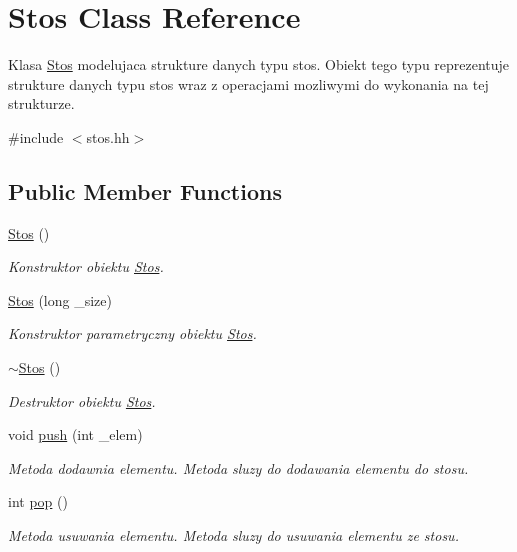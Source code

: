 \hypertarget{class_stos}{\section{Stos Class Reference}
\label{class_stos}
}


Klasa \hyperlink{class_stos}{Stos} modelujaca strukture danych typu stos. Obiekt tego typu reprezentuje strukture danych typu stos wraz z operacjami mozliwymi do wykonania na tej strukturze.  




{\ttfamily \#include $<$stos.\-hh$>$}

\subsection*{Public Member Functions}
\begin{DoxyCompactItemize}
\item 
\hyperlink{class_stos_a1de3b50386d5dfb56ddece17d0ea2389}{Stos} ()
\begin{DoxyCompactList}\small\item\em Konstruktor obiektu \hyperlink{class_stos}{Stos}. \end{DoxyCompactList}\item 
\hyperlink{class_stos_a6606affc11eed2b059b8caf287ffca25}{Stos} (long \-\_\-size)
\begin{DoxyCompactList}\small\item\em Konstruktor parametryczny obiektu \hyperlink{class_stos}{Stos}. \end{DoxyCompactList}\item 
\hyperlink{class_stos_af9a198e2540e18adcc0b5259105fd78e}{$\sim$\-Stos} ()
\begin{DoxyCompactList}\small\item\em Destruktor obiektu \hyperlink{class_stos}{Stos}. \end{DoxyCompactList}\item 
void \hyperlink{class_stos_afd5802e405946328cccca3eed676b493}{push} (int \-\_\-elem)
\begin{DoxyCompactList}\small\item\em Metoda dodawnia elementu. Metoda sluzy do dodawania elementu do stosu. \end{DoxyCompactList}\item 
int \hyperlink{class_stos_aabb14b8a389c55da6e2b50fbb179ed56}{pop} ()
\begin{DoxyCompactList}\small\item\em Metoda usuwania elementu. Metoda sluzy do usuwania elementu ze stosu. \end{DoxyCompactList}\end{DoxyCompactItemize}
